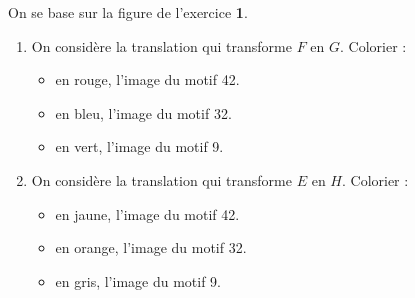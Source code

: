 \begin{exercice*}
    On se base sur la figure de l'exercice {\bfseries 1}.
    \begin{enumerate}
        \item On considère la translation qui transforme $F$ en $G$. Colorier  :
        \begin{itemize}
            \item en rouge, l'image du motif \num{42}.
            \item en bleu, l'image du motif \num{32}.
            \item en vert, l'image du motif \num{9}.
        \end{itemize}
        \item On considère la translation qui transforme $E$ en $H$. Colorier  :
        \begin{itemize}
            \item en jaune, l'image du motif \num{42}.
            \item en orange, l'image du motif \num{32}.
            \item en gris, l'image du motif \num{9}.
        \end{itemize}
    \end{enumerate}
\end{exercice*}

